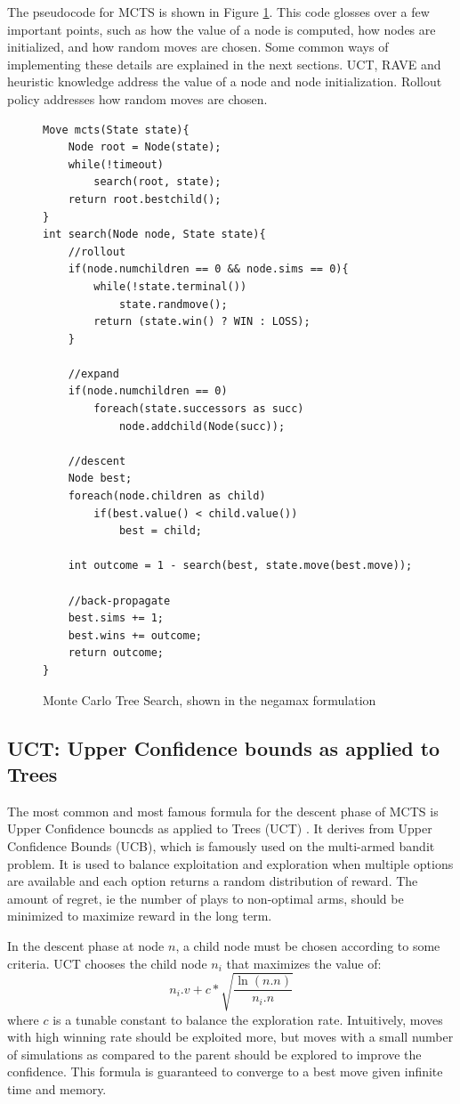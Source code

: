 The pseudocode for MCTS is shown in Figure \ref{fig:mctscode}. This code glosses over a few important points, such as how the value of a node is computed, how nodes are initialized, and how random moves are chosen. Some common ways of implementing these details are explained in the next sections. UCT, RAVE and heuristic knowledge address the value of a node and node initialization. Rollout policy addresses how random moves are chosen.

\begin{figure}

\begin{lstlisting}
Move mcts(State state){
	Node root = Node(state);
	while(!timeout)
		search(root, state);
	return root.bestchild();
}
int search(Node node, State state){
	//rollout
	if(node.numchildren == 0 && node.sims == 0){
		while(!state.terminal())
			state.randmove();
		return (state.win() ? WIN : LOSS);
	}

	//expand
	if(node.numchildren == 0)
		foreach(state.successors as succ)
			node.addchild(Node(succ));

	//descent
	Node best;
	foreach(node.children as child)
		if(best.value() < child.value())
			best = child;

	int outcome = 1 - search(best, state.move(best.move));

	//back-propagate
	best.sims += 1;
	best.wins += outcome;
	return outcome;
}
\end{lstlisting}

\caption{Monte Carlo Tree Search, shown in the negamax formulation}
\label{fig:mctscode}
\end{figure}


\subsection{UCT: Upper Confidence bounds as applied to Trees}\label{sec:uct}

The most common and most famous formula for the descent phase of MCTS is Upper Confidence bouncds as applied to Trees (UCT) \cite{kocsis2006uct}. It derives from Upper Confidence Bounds (UCB), which is famously used on the multi-armed bandit problem. It is used to balance exploitation and exploration when multiple options are available and each option returns a random distribution of reward. The amount of regret, ie the number of plays to non-optimal arms, should be minimized to maximize reward in the long term.

In the descent phase at node $n$, a child node must be chosen according to some criteria. UCT chooses the child node $n_i$ that maximizes the value of:
\begin{equation}\label{eqn:uct} n_i.v + c*\sqrt{\frac{\ln(n.n)}{n_i.n}}\end{equation}
where $c$ is a tunable constant to balance the exploration rate. Intuitively, moves with high winning rate should be exploited more, but moves with a small number of simulations as compared to the parent should be explored to improve the confidence. This formula is guaranteed to converge to a best move given infinite time and memory.




